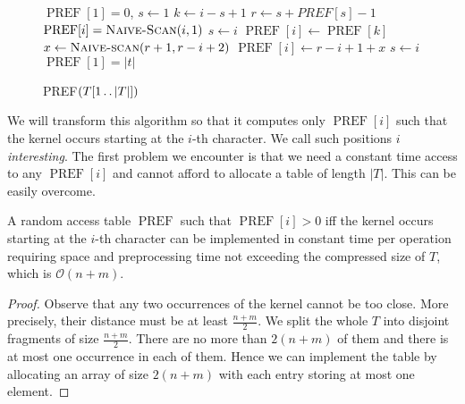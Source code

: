 \documentclass[runningheads]{llncs}
\newcommand{\twodots}{\mathinner{\ldotp\ldotp}}
\newcommand{\proc}[1]{\textnormal{\scshape#1}}
\DeclareMathOperator{\PREF}{PREF}
\begin{document}
\begin{figure*}
\begin{minipage}{\textwidth}
\begin{algorithm}[H]
\caption{\proc{PREF}$(T[1\twodots |T|])$}
\begin{algorithmic}[1]
\State $\PREF[1]=0$, $s \gets 1$
\label{line:for starts}
  \State $k \gets i-s+1$
  \State $r \gets s+PREF[s]-1$
    \State $\PREF[i] = \proc{Naive-Scan}(i,1)$
    \If{$\PREF[i] > 0$}
      \State $s \gets i$
    \EndIf
  \ElsIf{$\PREF[k]+k < \PREF[s]$}
    \State $\PREF[i] \gets \PREF[k]$
  \Else
    \State $x \gets \proc{Naive-scan}(r+1,r-i+2)$ \label{line:access}
    \State $\PREF[i] \gets r-i+1+x$
    \State $s \gets i$
  \EndIf
\EndFor
\State $\PREF[1] = |t|$
\end{algorithmic}
\end{algorithm}
\end{minipage}
\end{figure*}

We will transform this algorithm so that it computes only $\PREF[i]$ such that the kernel occurs starting at the $i$-th character. We call
such positions $i$ \emph{interesting}. The first problem we encounter is that we need a constant time access to any $\PREF[i]$ and cannot afford to allocate a table of length $|T|$. This can be easily overcome.

\begin{lemma}
\label{lemma:random access}
A random access table $\PREF$ such that $\PREF[i]>0$ iff the kernel occurs starting at the $i$-th character can be implemented in constant time
per operation requiring space and preprocessing time not exceeding the compressed size of $T$, which is $\mathcal{O}(n+m)$.
\end{lemma}

\begin{proof}
Observe that any two occurrences of the kernel cannot be too close. More precisely, their distance must be at least $\frac{n+m}{2}$. We split
the whole $T$ into disjoint fragments of size $\frac{n+m}{2}$. There are no more than $2(n+m)$ of them and there is at most one occurrence in
each of them. Hence we can implement the table by allocating an array of size $2(n+m)$ with each entry storing at most one element.
\end{proof}
\end{document}
